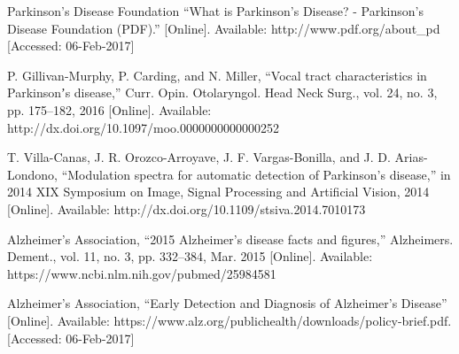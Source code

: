 \documentclass[conference]{IEEEtran}
\begin{document}
\begin{thebibliography}{1}
Parkinson’s Disease Foundation “What is Parkinson’s Disease? - Parkinson’s Disease Foundation (PDF).” [Online]. Available: http://www.pdf.org/about\_pd [Accessed: 06-Feb-2017]

P. Gillivan-Murphy, P. Carding, and N. Miller, “Vocal tract characteristics in Parkinsonʼs disease,” Curr. Opin. Otolaryngol. Head Neck Surg., vol. 24, no. 3, pp. 175–182, 2016 [Online]. Available: http://dx.doi.org/10.1097/moo.0000000000000252

T. Villa-Canas, J. R. Orozco-Arroyave, J. F. Vargas-Bonilla, and J. D. Arias-Londono, “Modulation spectra for automatic detection of Parkinson’s disease,” in 2014 XIX Symposium on Image, Signal Processing and Artificial Vision, 2014 [Online]. Available: http://dx.doi.org/10.1109/stsiva.2014.7010173

Alzheimer’s Association, “2015 Alzheimer’s disease facts and figures,” Alzheimers. Dement., vol. 11, no. 3, pp. 332–384, Mar. 2015 [Online]. Available: https://www.ncbi.nlm.nih.gov/pubmed/25984581

Alzheimer’s Association, “Early Detection and Diagnosis of Alzheimer’s Disease” [Online]. Available: https://www.alz.org/publichealth/downloads/policy-brief.pdf. [Accessed: 06-Feb-2017]

\end{thebibliography}




\end{document}
